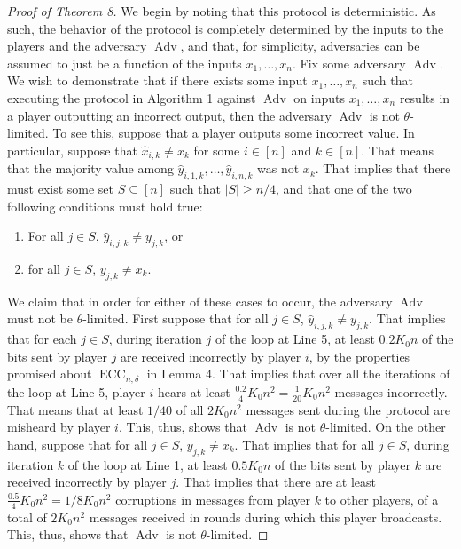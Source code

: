 \documentclass[10pt,a4paper]{article}
\begin{document}
\begin{proof}[Proof of Theorem 8]
We begin by noting that this protocol is deterministic. As such, the behavior of the protocol is completely determined by the inputs to the players and the adversary $\operatorname{Adv}$, and that, for simplicity, adversaries can be assumed to just be a function of the inputs $x_1,\ldots,x_n$.
Fix some adversary $\operatorname{Adv}$. We wish to demonstrate that if there exists some input $x_1,\ldots,x_n$ such that executing the protocol in Algorithm 1 against $\operatorname{Adv}$ on inputs $x_1,\ldots,x_n$ results in a player outputting an incorrect output, then the adversary $\operatorname{Adv}$ is not $\theta$-limited.
To see this, suppose that a player outputs some incorrect value. In particular, suppose that $\hat x_{i,k}\ne x_k$ for some $i\in[n]$ and $k\in[n]$. That means that the majority value among $\hat y_{i,1,k},\ldots,\hat y_{i,n,k}$ was not $x_k$.
That implies that there must exist some set $S\subseteq[n]$ such that $|S|\ge n/4$, and that one of the two following conditions must hold true:
\begin{enumerate}\item For all $j\in S$, $\hat y_{i,j,k}\ne y_{j,k}$, or\item for all $j\in S$, $y_{j,k}\ne x_k$.\end{enumerate}
We claim that in order for either of these cases to occur, the adversary $\operatorname{Adv}$ must not be $\theta$-limited. First suppose that for all $j\in S$, $\hat y_{i,j,k}\ne y_{j,k}$. That implies that for each $j\in S$, during iteration $j$ of the loop at Line 5, at least $0.2K_0 n$ of the bits sent by player $j$ are received incorrectly by player $i$, by the properties promised about $\operatorname{ECC}_{n,\delta}$ in Lemma 4. That implies that over all the iterations of the loop at Line 5, player $i$ hears at least $\frac{0.2}4 K_0 n^2=\frac1{20}K_0 n^2$ messages incorrectly. That means that at least $1/40$ of all $2K_0 n^2$ messages sent during the protocol are misheard by player $i$. This, thus, shows that $\operatorname{Adv}$ is not $\theta$-limited.
On the other hand, suppose that for all $j\in S$, $y_{j,k}\ne x_k$. That implies that for all $j\in S$, during iteration $k$ of the loop at Line 1, at least $0.5K_0 n$ of the bits sent by player $k$ are received incorrectly by player $j$. That implies that there are at least $\frac{0.5}4 K_0 n^2=1/8K_0 n^2$ corruptions in messages from player $k$ to other players, of a total of $2K_0 n^2$ messages received in rounds during which this player broadcasts. This, thus, shows that $\operatorname{Adv}$ is not $\theta$-limited.
\end{proof}
\end{document}
